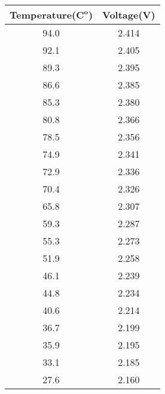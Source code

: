  


 
\begin{center}
\begin{tabular}{|c|c|}
\hline
\textbf{Temperature($\mathbf{C^o}$)}&\textbf{Voltage(V)}\\
\hline
94.0&2.414\\
\hline
92.1&2.405\\
\hline
89.3&2.395\\
\hline
86.6&2.385\\
\hline
85.3&2.380\\
\hline
80.8&2.366\\
\hline
78.5&2.356\\
\hline
74.9&2.341\\
\hline
72.9&2.336\\
\hline
70.4&2.326\\
\hline
65.8&2.307\\
\hline
59.3&2.287\\
\hline
55.3&2.273\\
\hline
51.9&2.258\\
\hline
46.1&2.239\\
\hline
44.8&2.234\\
\hline
40.6&2.214\\
\hline
36.7&2.199\\
\hline
35.9&2.195\\
\hline
33.1&2.185\\
\hline
27.6&2.160\\
\hline
 
\end{tabular}\\
 \end{center}




